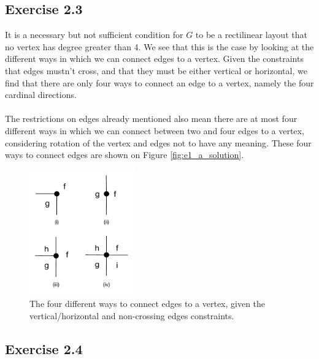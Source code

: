 \documentclass[12pt]{article}
\begin{document}
\subsection*{Exercise 2.3}
It is a necessary but not sufficient condition for $G$ to be a rectilinear layout that no vertex has degree greater than 4. We see that this is the case by looking at the different ways in which we can connect edges to a vertex. Given the constraints that edges mustn't cross, and that they must be either vertical or horizontal, we find that there are only four ways to connect an edge to a vertex, namely the four cardinal directions.\\
\\
The restrictions on edges already mentioned also mean there are at most four different ways in which we can connect between two and four edges to a vertex, considering rotation of the vertex and edges not to have any meaning. These four ways to connect edges are shown on Figure \ref{fig:e1_a_solution}.

\begin{figure}[h]
    \centering
      \includegraphics[width=0.4\textwidth]{figures/e2_3}
    \caption{The four different ways to connect edges to a vertex, given the vertical/horizontal and non-crossing edges constraints.}
    \label{fig:e2_3}
\end{figure}

\subsection*{Exercise 2.4}
\end{document}
